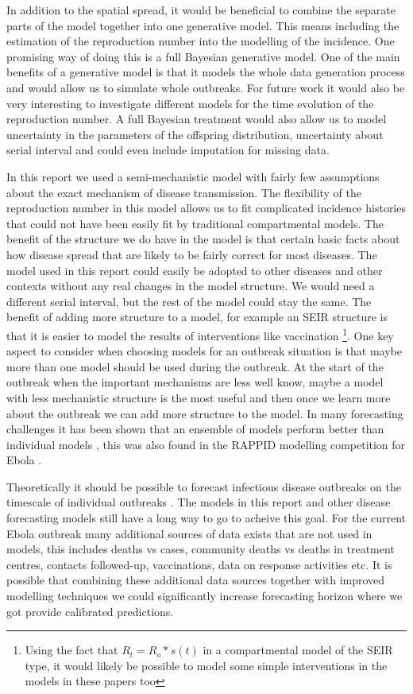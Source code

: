 \documentclass[12pt]{article}
\begin{document}
In addition to the spatial spread, it would be beneficial to combine the separate parts of the model together into one generative model. This means including the estimation of the reproduction number into the modelling of the incidence. One promising way of doing this is a full Bayesian generative model. One of the main benefits of a generative model is that it models the whole data generation process and would allow us to simulate whole outbreaks. For future work it would also be very interesting to investigate different models for the time evolution of the reproduction number. A full Bayesian treatment would also allow us to model uncertainty in the parameters of the offspring distribution, uncertainty about serial interval and could even include imputation for missing data. 

In this report we used a semi-mechanistic model with fairly few assumptions about the exact mechanism of disease transmission. The flexibility of the reproduction number in this model allows us to fit complicated incidence histories that could not have been easily fit by traditional compartmental models. The benefit of the structure we do have in the model is that certain basic facts about how disease spread that are likely to be fairly correct for most diseases. The model used in this report could easily be adopted to other diseases and other contexts without any real changes in the model structure. We would need a different serial interval, but the rest of the model could stay the same. The benefit of adding more structure to a model, for example an SEIR structure is that it is easier to model the results of interventions like vaccination \footnote{Using the fact that $R_t=R_o*s(t)$ in a compartmental model of the SEIR type, it would likely be possible to model some simple interventions in the models in these papers too}. One key aspect to consider when choosing models for an outbreak situation is that maybe more than one model should be used during the outbreak. At the start of the outbreak when the important mechanisms are less well know, maybe a model with less mechanistic structure is the most useful and then once we learn more about the outbreak we can add more structure to the model. In many forecasting challenges it has been shown that an ensemble of models perform better than individual models \cite{dietterichEnsembleMethodsMachine2000}, this was also found in the RAPPID modelling competition for Ebola \cite{viboudRAPIDDEbolaForecasting2018}. 

Theoretically it should be possible to forecast infectious disease outbreaks on the timescale of individual outbreaks \cite{scarpinoPredictabilityInfectiousDisease2019}. The models in this report and other disease forecasting models still have a long way to go to acheive this goal. For the current Ebola outbreak many additional sources of data exists that are not used in models, this includes deaths vs cases, community deaths vs deaths in treatment centres, contacts followed-up, vaccinations, data on response activities etc. It is possible that combining these additional data sources together with improved modelling techniques we could significantly increase forecasting horizon where we got provide calibrated predictions. 
\end{document}
